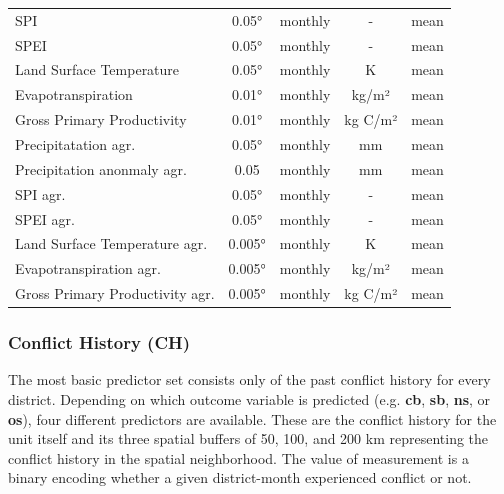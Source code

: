 \documentclass[a4paper,11pt]{article}
\begin{document}
\begin{ThreePartTable}
\begin{longtable}[t]{lcccl}
\hspace{1em}SPI & 0.05° & monthly & - & mean\\
\hspace{1em}SPEI & 0.05° & monthly & - & mean\\
\hspace{1em}Land Surface Temperature & 0.05° & monthly & K & mean\\
\hspace{1em}Evapotranspiration & 0.01° & monthly & kg/m² & mean\\
\hspace{1em}Gross Primary Productivity & 0.01° & monthly & kg C/m² & mean\\
\hspace{1em}Precipitatation agr. & 0.05° & monthly & mm & mean\\
\hspace{1em}Precipitation anonmaly agr. & 0.05 & monthly & mm & mean\\
\hspace{1em}SPI agr. & 0.05° & monthly & - & mean\\
\hspace{1em}SPEI agr. & 0.05° & monthly & - & mean\\
\hspace{1em}Land Surface Temperature agr. & 0.005° & monthly & K & mean\\
\hspace{1em}Evapotranspiration agr. & 0.005° & monthly & kg/m² & mean\\
\hspace{1em}Gross Primary Productivity agr. & 0.005° & monthly & kg C/m² & mean\\*
\end{longtable}
\end{ThreePartTable}
\endgroup{}
\endgroup{}

\hypertarget{conflict-history-ch}{%
\subsubsection{Conflict History (CH)}\label{conflict-history-ch}}

The most basic predictor set consists only of the past conflict history for every
district. Depending on which outcome variable is predicted (e.g. \textbf{cb}, \textbf{sb}, \textbf{ns}, or \textbf{os}),
four different predictors are available. These are the conflict history for the
unit itself and its three spatial buffers of 50, 100, and 200 km representing
the conflict history in the spatial neighborhood. The value of measurement
is a binary encoding whether a given district-month experienced conflict
or not.
\end{document}
